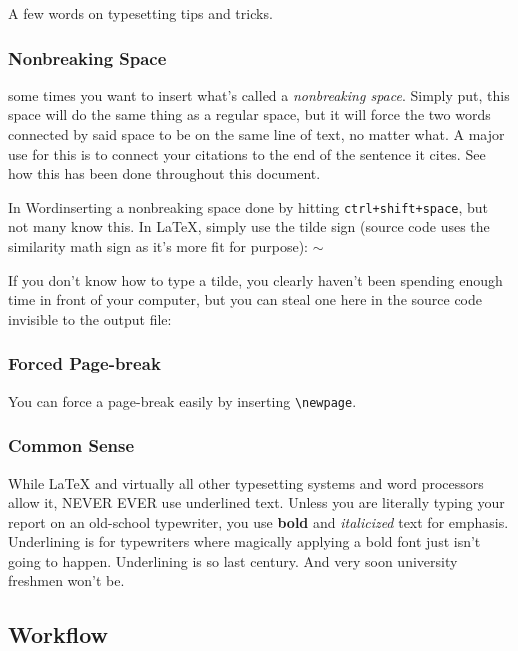 A few words on typesetting tips and tricks.

\subsubsection{Nonbreaking Space}\label{sec.nonbreakingspace}

 some times you want to insert what's called a \textit{nonbreaking space}. Simply put, this space will do the same thing as a regular space, but it will force the two words connected by said space to be on the same line of text, no matter what. A major use for this is to connect your citations to the end of the sentence it cites. See how this has been done throughout this document.

In Word\texttrademark inserting a nonbreaking space done by hitting \verb|ctrl+shift+space|, but not many know this. In \LaTeX{}, simply use the tilde sign (source code uses the similarity math sign as it's more fit for purpose): $\sim$

If you don't know how to type a tilde, you clearly haven't been spending enough time in front of your computer, but you can steal one here in the source code invisible to the output file: ~ 

\subsubsection{Forced Page-break}\label{sec.forcedpagebreak}

You can force a page-break easily by inserting \verb|\newpage|.

\subsubsection{Common Sense}\label{sec.commonsense}

While \LaTeX{} and virtually all other typesetting systems and word processors allow it, NEVER EVER use underlined text. Unless you are literally typing your report on an old-school typewriter, you use \textbf{bold} and \textit{italicized} text for emphasis. Underlining is for typewriters where magically applying a bold font just isn't going to happen. Underlining is so last century. And very soon university freshmen won't be.

\subsection{Workflow}\label{sec.workflow}


